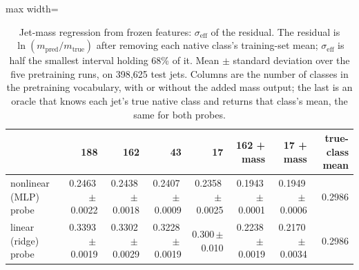 \begin{table}[t]
\centering
\small
\setlength{\tabcolsep}{4pt}
\caption{Jet-mass regression from frozen features: $\sigma_{\mathrm{eff}}$ of the residual. The residual is $\ln(m_{\mathrm{pred}}/m_{\mathrm{true}})$ after removing each native class's training-set mean; $\sigma_{\mathrm{eff}}$ is half the smallest interval holding 68\% of it. Mean $\pm$ standard deviation over the five pretraining runs, on 398{,}625 test jets. Columns are the number of classes in the pretraining vocabulary, with or without the added mass output; the last is an oracle that knows each jet's true native class and returns that class's mean, the same for both probes.}
\label{tab:mass}
\begin{adjustbox}{max width=\linewidth}
\begin{tabular}{l rrrrrrr}
\toprule
& 188 & 162 & 43 & 17 & 162 + mass & 17 + mass & true-class mean \\
\midrule
nonlinear (MLP) probe & 0.2463\,$\pm$\,0.0022 & 0.2438\,$\pm$\,0.0018 & 0.2407\,$\pm$\,0.0009 & 0.2358\,$\pm$\,0.0025 & 0.1943\,$\pm$\,0.0001 & 0.1949\,$\pm$\,0.0006 & 0.2986 \\
linear (ridge) probe & 0.3393\,$\pm$\,0.0019 & 0.3302\,$\pm$\,0.0029 & 0.3228\,$\pm$\,0.0019 & 0.300\,$\pm$\,0.010 & 0.2238\,$\pm$\,0.0019 & 0.2170\,$\pm$\,0.0034 & 0.2986 \\
\bottomrule
\end{tabular}
\end{adjustbox}
\end{table}

